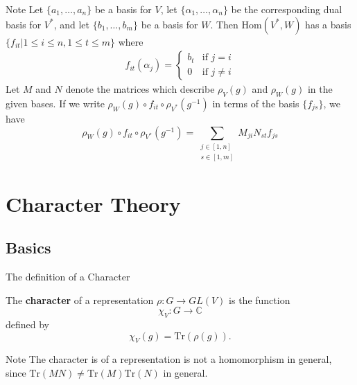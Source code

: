 \begin{frame}
\begin{block}{Note}
Let $\{ a_1,  \ldots, a_n\}$ be a basis for $V$, let $\{\alpha_1, \ldots, \alpha_n \}$ be the corresponding dual basis for $V^{*}$, and let $\{b_1,  \ldots,b_m\}$ be a basis for $W$.  Then $\text{Hom}(V^*,W)$ has a basis $\{ f_{it} | 1 \leq i \leq n, 1 \leq t \leq m \}$ where
\begin{align*}
f_{it} (\alpha_j) = \begin{cases} b_t &\text{if } j = i\\ 0 &\text{if } j \neq i \end{cases} 
\end{align*}
Let $M$ and $N$ denote the matrices which describe $\rho_V (g)$ and $\rho_W (g)$ in the given bases.  If we write $\rho_W (g) \circ f_{it} \circ \rho_{V^{*}} (g^ {-1})$ in terms of the basis $\{ f_{js} \}$, we have 
\[\rho_W (g) \circ f_{it} \circ \rho_{V^{*}} (g^ {-1}) = \sum_{\substack{j \in [1,n] \\  s \in [1,m]}} M_{ji} N_{st} f_{js} \]
\end{block}
\end{frame}

\section{Character Theory}
\subsection{Basics}
\begin{frame}{The definition of a Character}
\begin{definition}
The \textbf{character} of a representation $\rho \colon G \to GL(V)$ is the function \[ \chi_V \colon G \to \mathbb{C}\] defined by \[\chi_V(g) = \text{Tr}(\rho(g)).\]
\end{definition}
\begin{block}{Note}
The character is of a representation is not a homomorphism in general, since $\text{Tr}(MN) \neq \text{Tr}(M) \text{Tr}(N)$ in general.
\end{block}
\end{frame}

